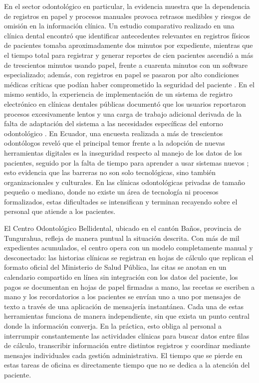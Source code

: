 En el sector odontológico en particular, la evidencia muestra que la dependencia de registros en papel y procesos manuales provoca retrasos medibles y riesgos de omisión en la información clínica. Un estudio comparativo realizado en una clínica dental encontró que identificar antecedentes relevantes en registros físicos de pacientes tomaba aproximadamente dos minutos por expediente, mientras que el tiempo total para registrar y generar reportes de cien pacientes ascendió a más de trescientos minutos usando papel, frente a cuarenta minutos con un software especializado; además, con registros en papel se pasaron por alto condiciones médicas críticas que podían haber comprometido la seguridad del paciente \cite{scarano2025digital}. En el mismo sentido, la experiencia de implementación de un sistema de registro electrónico en clínicas dentales públicas documentó que los usuarios reportaron procesos excesivamente lentos y una carga de trabajo adicional derivada de la falta de adaptación del sistema a las necesidades específicas del entorno odontológico \cite{hajisidek2017ehr}. En Ecuador, una encuesta realizada a más de trescientos odontólogos reveló que el principal temor frente a la adopción de nuevas herramientas digitales es la inseguridad respecto al manejo de los datos de los pacientes, seguido por la falta de tiempo para aprender a usar sistemas nuevos \cite{cherrezojeda2020ict}; esto evidencia que las barreras no son solo tecnológicas, sino también organizacionales y culturales. En las clínicas odontológicas privadas de tamaño pequeño o mediano, donde no existe un área de tecnología ni procesos formalizados, estas dificultades se intensifican y terminan recayendo sobre el personal que atiende a los pacientes.

El Centro Odontológico Bellidental, ubicado en el cantón Baños, provincia de Tungurahua, refleja de manera puntual la situación descrita. Con más de mil expedientes acumulados, el centro opera con un modelo completamente manual y desconectado: las historias clínicas se registran en hojas de cálculo que replican el formato oficial del Ministerio de Salud Pública, las citas se anotan en un calendario compartido en línea sin integración con los datos del paciente, los pagos se documentan en hojas de papel firmadas a mano, las recetas se escriben a mano y los recordatorios a los pacientes se envían uno a uno por mensajes de texto a través de una aplicación de mensajería instantánea. Cada una de estas herramientas funciona de manera independiente, sin que exista un punto central donde la información converja. En la práctica, esto obliga al personal a interrumpir constantemente las actividades clínicas para buscar datos entre filas de cálculo, transcribir información entre distintos registros y coordinar mediante mensajes individuales cada gestión administrativa. El tiempo que se pierde en estas tareas de oficina es directamente tiempo que no se dedica a la atención del paciente.

